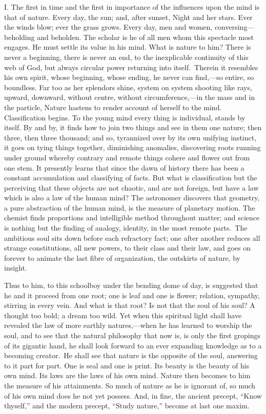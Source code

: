 \vspace{1\baselineskip}

I. The first in time and the first in importance of the influences
upon the mind is that of nature. Every day, the sun; and, after
sunset, Night and her stars. Ever the winds blow; ever  the
grass grows. Every day, men and women, con\-ver\-sing---be\-hold\-ing
and beholden. The scholar is he of all men whom this spectacle most
engages. He must settle its value in his mind. What is nature to him?
There is never a beginning, there is never an end, to the
inexplicable continuity of this web of God, but always circular power
returning into itself. Therein it resembles his own spirit, whose
beginning, whose ending, he never can find,---so entire, so boundless.
Far too as her splendors shine, system on system shooting like rays,
upward, downward, without centre, without cir\-cum\-fer\-ence,---in
the mass and in the particle, Nature hastens to render account of
herself to the mind. Classification begins. To the young mind every
thing is individual, stands by itself. By and by, it finds how to join
two things and see in them one nature; then three, then three
thousand; and so, tyrannized over by its own unifying instinct, it
goes on tying things together, diminishing anomalies, discovering
roots running under ground whereby contrary and remote things cohere
and flower out from one stem. It presently learns that since the dawn
of history there has been a constant accumulation and classifying of
facts. But what is classification but the perceiving that 
these objects are not chaotic, and are not foreign, but have a law
which is also a law of the human mind? The astronomer discovers that
geometry, a pure abstraction of the human mind, is the measure of
planetary motion. The chemist finds proportions and intelligible
method throughout matter; and science is nothing but the finding of
analogy, identity, in the most remote parts. The ambitious soul sits
down before each refractory fact; one after another reduces all
strange constitutions, all new powers, to their class and their law,
and goes on forever to animate the last fibre of organization, the
outskirts of nature, by insight.

Thus to him, to this schoolboy under the bending dome of day, is
suggested that he and it proceed from one root; one is leaf and one is
flower; relation, sympathy, stirring in every vein. And what is that
root? Is not that the soul of his soul? A thought too bold; a dream
too wild. Yet when this spiritual light shall have revealed the law of
more earthly na\-tures,---when he has learned to worship the soul, and
to see that the natural philosophy that now is, is only the first
gropings of its gigantic hand, he shall look forward to an ever
expanding knowledge as to a becoming creator. He shall see 
that nature is the opposite of the soul, answering to it part for
part. One is seal and one is print. Its beauty is the beauty of his
own mind. Its laws are the laws of his own mind. Nature then becomes
to him the measure of his attainments. So much of nature as he is
ignorant of, so much of his own mind does he not yet possess. And, in
fine, the ancient precept, ``Know thyself,'' and the modern precept,
``Study nature,'' become at last one maxim.

